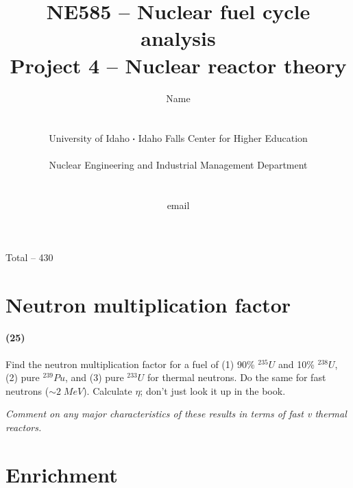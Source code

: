 \documentclass[11pt,a4paper]{article}
\newcommand*\sq{\mathbin{\vcenter{\hbox{\rule{.3ex}{.3ex}}}}} %
\begin{document}
\begin{titlepage}
    \title{
        NE585 -- Nuclear fuel cycle analysis\\
        Project 4 -- Nuclear reactor theory\\
    }
    \author{
        Name
        \\ \\ \\
        University of Idaho $\sq$ Idaho Falls Center for Higher Education
        \\ \\
        Nuclear Engineering and Industrial Management Department
        \\ \\ \\
        email 
    }
\clearpage %
\maketitle
\vspace*{\fill}
\begin{flushright}{
        Total -- 430 
}
\end{flushright}
\thispagestyle{empty} %
\end{titlepage}

\printnoidxglossary

\newpage

\section{Neutron multiplication factor}
\paragraph*{(25)}
Find the neutron multiplication factor for a fuel of (1) 90\% $^{235}U$ and 10\% $^{238}U$, (2) pure $^{239}Pu$, and (3) pure $^{233}U$ for thermal neutrons. Do the same for fast neutrons ($\sim 2 \; MeV$). Calculate $\eta$; don't just look it up in the book. 

\vspace{\baselineskip}

\noindent\textit{Comment on any major characteristics of these results in terms of fast v thermal reactors.}





\newpage

\section{Enrichment}
\end{document}
